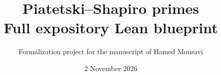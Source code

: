 
\newif\ifDetailed\Detailedtrue
\title{Piatetski--Shapiro primes\\Full expository Lean blueprint}
\author{Formalization project for the manuscript of Hamed Mousavi}
\date{2 November 2026}

\maketitle
\tableofcontents


